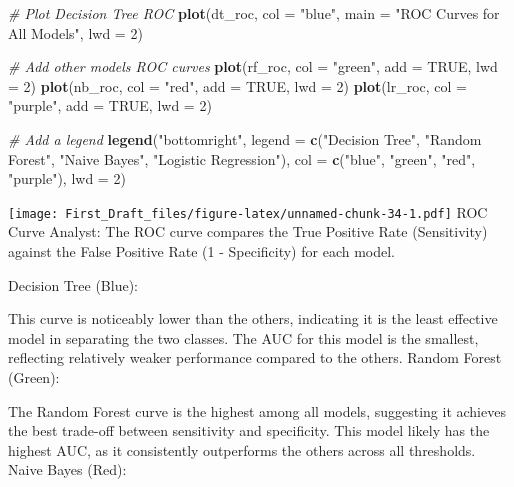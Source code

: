 \documentclass[
]{article}
\newenvironment{Shaded}{\begin{snugshade}}{\end{snugshade}}
\newcommand{\AttributeTok}[1]{\textcolor[rgb]{0.13,0.29,0.53}{#1}}
\newcommand{\CommentTok}[1]{\textcolor[rgb]{0.56,0.35,0.01}{\textit{#1}}}
\newcommand{\ConstantTok}[1]{\textcolor[rgb]{0.56,0.35,0.01}{#1}}
\newcommand{\DecValTok}[1]{\textcolor[rgb]{0.00,0.00,0.81}{#1}}
\newcommand{\FunctionTok}[1]{\textcolor[rgb]{0.13,0.29,0.53}{\textbf{#1}}}
\newcommand{\NormalTok}[1]{#1}
\newcommand{\StringTok}[1]{\textcolor[rgb]{0.31,0.60,0.02}{#1}}
\begin{document}
\begin{Shaded}
\begin{Highlighting}[]
\CommentTok{\# Plot Decision Tree ROC}
\FunctionTok{plot}\NormalTok{(dt\_roc, }\AttributeTok{col =} \StringTok{"blue"}\NormalTok{, }\AttributeTok{main =} \StringTok{"ROC Curves for All Models"}\NormalTok{, }\AttributeTok{lwd =} \DecValTok{2}\NormalTok{)}

\CommentTok{\# Add other models\textquotesingle{} ROC curves}
\FunctionTok{plot}\NormalTok{(rf\_roc, }\AttributeTok{col =} \StringTok{"green"}\NormalTok{, }\AttributeTok{add =} \ConstantTok{TRUE}\NormalTok{, }\AttributeTok{lwd =} \DecValTok{2}\NormalTok{)}
\FunctionTok{plot}\NormalTok{(nb\_roc, }\AttributeTok{col =} \StringTok{"red"}\NormalTok{, }\AttributeTok{add =} \ConstantTok{TRUE}\NormalTok{, }\AttributeTok{lwd =} \DecValTok{2}\NormalTok{)}
\FunctionTok{plot}\NormalTok{(lr\_roc, }\AttributeTok{col =} \StringTok{"purple"}\NormalTok{, }\AttributeTok{add =} \ConstantTok{TRUE}\NormalTok{, }\AttributeTok{lwd =} \DecValTok{2}\NormalTok{)}


\CommentTok{\# Add a legend}
\FunctionTok{legend}\NormalTok{(}\StringTok{"bottomright"}\NormalTok{, }\AttributeTok{legend =} \FunctionTok{c}\NormalTok{(}\StringTok{"Decision Tree"}\NormalTok{, }\StringTok{"Random Forest"}\NormalTok{, }\StringTok{"Naive Bayes"}\NormalTok{, }\StringTok{"Logistic Regression"}\NormalTok{),}
       \AttributeTok{col =} \FunctionTok{c}\NormalTok{(}\StringTok{"blue"}\NormalTok{, }\StringTok{"green"}\NormalTok{, }\StringTok{"red"}\NormalTok{, }\StringTok{"purple"}\NormalTok{), }\AttributeTok{lwd =} \DecValTok{2}\NormalTok{)}
\end{Highlighting}
\end{Shaded}

\texttt{[image: First\_Draft\_files/figure-latex/unnamed-chunk-34-1.pdf]}
ROC Curve Analyst: The ROC curve compares the True Positive Rate
(Sensitivity) against the False Positive Rate (1 - Specificity) for each
model.

Decision Tree (Blue):

This curve is noticeably lower than the others, indicating it is the
least effective model in separating the two classes. The AUC for this
model is the smallest, reflecting relatively weaker performance compared
to the others. Random Forest (Green):

The Random Forest curve is the highest among all models, suggesting it
achieves the best trade-off between sensitivity and specificity. This
model likely has the highest AUC, as it consistently outperforms the
others across all thresholds. Naive Bayes (Red):
\end{document}

